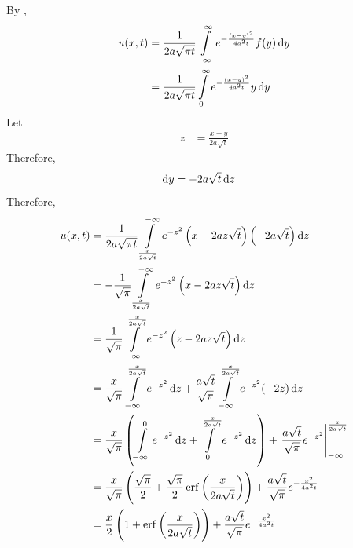 \documentclass[titlepage, fleqn, a4paper, 12pt, twoside]{article}
\theoremstyle{definition}
\theoremstyle{theorem}
\DeclareMathOperator{\erf}{erf}
\begin{document}
\begin{solution}
	By ,
	\begin{align*}
		u(x,t) & = \frac{1}{2 a \sqrt{\pi t}} \int\limits_{-\infty}^{\infty} e^{-\frac{(x - y)^2}{4 a^2 t}} f(y) \dif y \\
                       & = \frac{1}{2 a \sqrt{\pi t}} \int\limits_{0}^{\infty} e^{-\frac{(x - y)^2}{4 a^2 t}} y \dif y
	\end{align*}
	Let
	\begin{align*}
		z & = \frac{x - y}{2 a \sqrt{t}}
	\end{align*}
	Therefore,
	\begin{align*}
		\dif y & = -2 a \sqrt{t} \dif z
	\end{align*}
	Therefore,
	\begin{align*}
		u(x,t) & = \frac{1}{2 a \sqrt{\pi t}} \int\limits_{\frac{x}{2 a \sqrt{t}}}^{-\infty} e^{-z^2} \left( x - 2 a z \sqrt{t} \right) \left( -2 a \sqrt{t} \right) \dif z                                                                            \\
                       & = -\frac{1}{\sqrt{\pi}} \int\limits_{\frac{x}{2 a \sqrt{t}}}^{-\infty} e^{-z^2} \left( x - 2 a z \sqrt{t} \right) \dif z                                                                                                              \\
                       & = \frac{1}{\sqrt{\pi}} \int\limits_{-\infty}^{\frac{x}{2 a \sqrt{t}}} e^{-z^2} \left( z - 2 a z \sqrt{t} \right) \dif z                                                                                                               \\
                       & = \frac{x}{\sqrt{\pi}} \int\limits_{-\infty}^{\frac{x}{2 a \sqrt{t}}} e^{-z^2} \dif z + \frac{a \sqrt{t}}{\sqrt{\pi}} \int\limits_{-\infty}^{\frac{x}{2 a \sqrt{t}}} e^{-z^2} (-2 z) \dif z                                           \\
                       & = \frac{x}{\sqrt{\pi}} \left( \int\limits_{-\infty}^{0} e^{-z^2} \dif z + \int\limits_{0}^{\frac{x}{2 a \sqrt{t}}} e^{-z^2} \dif z \right) + \left. \frac{a \sqrt{t}}{\sqrt{\pi}} e^{-z^2} \right|_{-\infty}^{\frac{x}{2 a \sqrt{t}}} \\
                       & = \frac{x}{\sqrt{\pi}} \left( \frac{\sqrt{\pi}}{2} + \frac{\sqrt{\pi}}{2} \erf\left( \frac{x}{2 a \sqrt{t}} \right) \right) + \frac{a \sqrt{t}}{\sqrt{\pi}} e^{-\frac{x^2}{4 a^2 t}}                                                  \\
                       & = \frac{x}{2} \left( 1 + \erf\left( \frac{x}{2 a \sqrt{t}} \right) \right) + \frac{a \sqrt{t}}{\sqrt{\pi}} e^{-\frac{x^2}{4 a^2 t}}
	\end{align*}
\end{solution}
\end{document}
